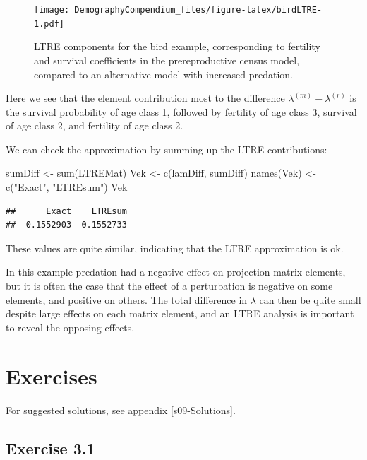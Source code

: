 \documentclass[
]{book}
\newenvironment{Shaded}{\begin{snugshade}}{\end{snugshade}}
\newcommand{\FunctionTok}[1]{\textcolor[rgb]{0.00,0.00,0.00}{#1}}
\newcommand{\NormalTok}[1]{#1}
\newcommand{\OtherTok}[1]{\textcolor[rgb]{0.56,0.35,0.01}{#1}}
\newcommand{\StringTok}[1]{\textcolor[rgb]{0.31,0.60,0.02}{#1}}
\begin{document}
\begin{figure}
\centering
\texttt{[image: DemographyCompendium\_files/figure-latex/birdLTRE-1.pdf]}
\caption{\label{fig:birdLTRE}LTRE components for the bird example, corresponding to fertility and survival coefficients in the prereproductive census model, compared to an alternative model with increased predation.}
\end{figure}

Here we see that the element contribution most to the difference \(\lambda^{(m)}-\lambda^{(r)}\) is the survival probability of age class 1, followed by fertility of age class 3, survival of age class 2, and fertility of age class 2.

We can check the approximation by summing up the LTRE contributions:

\begin{Shaded}
\begin{Highlighting}[]
\NormalTok{sumDiff }\OtherTok{\textless{}{-}} \FunctionTok{sum}\NormalTok{(LTREMat)}
\NormalTok{Vek }\OtherTok{\textless{}{-}} \FunctionTok{c}\NormalTok{(lamDiff, sumDiff)}
\FunctionTok{names}\NormalTok{(Vek) }\OtherTok{\textless{}{-}} \FunctionTok{c}\NormalTok{(}\StringTok{"Exact"}\NormalTok{, }\StringTok{"LTREsum"}\NormalTok{)}
\NormalTok{Vek}
\end{Highlighting}
\end{Shaded}

\begin{verbatim}
##      Exact    LTREsum 
## -0.1552903 -0.1552733
\end{verbatim}

These values are quite similar, indicating that the LTRE approximation is ok.

In this example predation had a negative effect on projection matrix elements, but it is often the case that the effect of a perturbation is negative on some elements, and positive on others. The total difference in \(\lambda\) can then be quite small despite large effects on each matrix element, and an LTRE analysis is important to reveal the opposing effects.

\hypertarget{exercises-2}{%
\section{Exercises}\label{exercises-2}}

For suggested solutions, see appendix \ref{s09-Solutions}.

\hypertarget{exercise-3.1}{%
\subsection*{Exercise 3.1}\label{exercise-3.1}}
\end{document}
